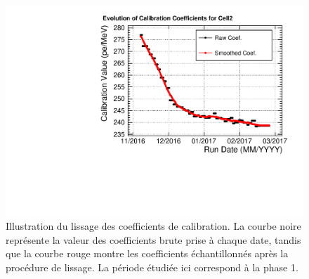 {%
\begin{figure}[h!]
  \centering
  \includegraphics[width=0.85\linewidth]{images/cc_smoothing_show.pdf}
  \caption[Illustration du lissage des coefficients de calibration]{Illustration du lissage des coefficients de calibration. La courbe noire représente la valeur des coefficients brute prise à chaque date, tandis que la courbe rouge montre les coefficients échantillonnés après la procédure de lissage. La période étudiée ici correspond à la phase 1.}
  \label{fig:cc_smoothing_show.pdf}
\end{figure}
\clearpage
}

